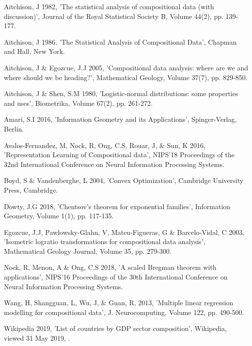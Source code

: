 \documentclass[BSc]{usydthesis}
\numberwithin{equation}{chapter}
\theoremstyle{remark}
\begin{document}
\begin{thebibliography}{0}

{\sc Aitchison, J 1982}, 'The statistical analysis of compositional data (with discussion)', Journal of the Royal Statistical Society B, Volume 44(2), pp. 139-177.

{\sc Aitchison, J 1986}, 'The Statistical Analysis of Compositional Data', Chapman and Hall, New York.

{\sc Aitchison, J \& Egozcue, J.J 2005}, 'Compositional data analysis: where are we and where should we be heading?', Mathematical Geology, Volume 37(7), pp. 829-850.

{\sc Aitchison, J \& Shen, S.M 1980}, 'Logistic-normal distributions: some properties and uses', Biometrika, Volume 67(2), pp. 261-272.

{\sc Amari, S.I 2016}, 'Information Geometry and its Applications', Spinger-Verlag, Berlin.

{\sc Avalos-Fernandez, M, Nock, R, Ong, C.S, Rouar, J, \& Sun, K 2016}, 'Representation Learning of Compositional data', NIPS'18 Proceedings of the 32nd International Conference on Neural Information Processing Systems. 

{\sc Boyd, S \& Vandenberghe, L 2004}, 'Convex Optimization', Cambridge University Press, Cambridge.

{\sc Dowty, J.G 2018}, 'Chentsov's theorem for exponential families', Information Geometry, Volume 1(1), pp. 117-135.

{\sc Egozcue, J.J, Pawlowsky-Glahn, V, Mateu-Figueras, G \& Barcelo-Vidal, C 2003}, 'Isometric logratio transformations for compositional data analysis', Mathematical Geology Journal, Volume 35, pp. 279-300.

{\sc Nock, R, Menon, A \& Ong, C.S 2018}, 'A scaled Bregman theorem with applications', NIPS'16 Proceedings of the 30th International Conference on Neural Information Processing Systems. 

{\sc Wang, H, Shangguan, L, Wu, J, \& Guan, R, 2013}, 'Multiple linear regression modelling for compositional data', J. Neurocomputing, Volume 122, pp. 490-500.

{\sc Wikipedia 2019}, 'List of countries by GDP sector composition', Wikipedia, viewed 31 May 2019, .



\end{thebibliography}
\end{document}
